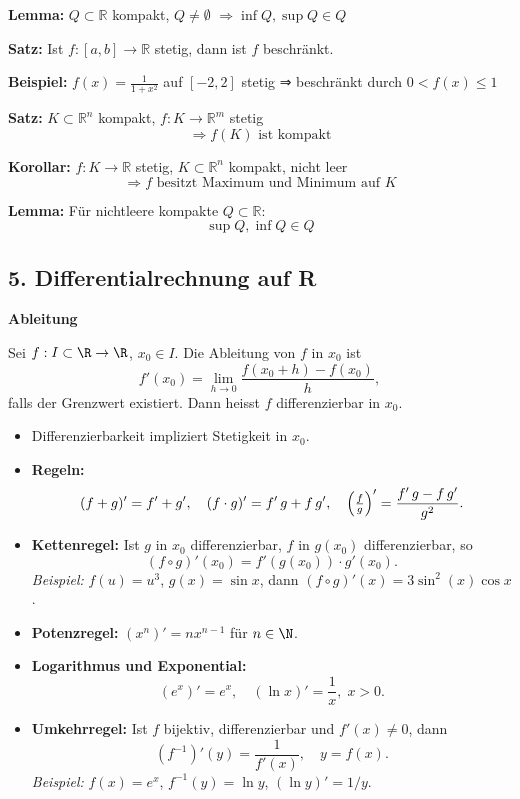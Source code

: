 \begin{itemize}
\textbf{Lemma:}  
\(Q \subset \mathbb{R}\) kompakt, \(Q \ne \emptyset\)  
\(\Rightarrow \inf Q, \sup Q \in Q\)

\textbf{Satz:}  
Ist \( f: [a,b] \to \mathbb{R} \) stetig, dann ist \( f \) beschränkt.

\textbf{Beispiel:}  
\( f(x) = \frac{1}{1 + x^2} \) auf \( [-2, 2] \) stetig ⇒ beschränkt durch \( 0 < f(x) \leq 1 \)

\textbf{Satz:}  
\( K \subset \mathbb{R}^n \) kompakt,\; \( f: K \to \mathbb{R}^m \) stetig  
\[
\Rightarrow f(K) \text{ ist kompakt}
\]


\textbf{Korollar:}  
\( f: K \to \mathbb{R} \) stetig, \( K \subset \mathbb{R}^n \) kompakt, nicht leer  
\[
\Rightarrow f \text{ besitzt Maximum und Minimum auf } K
\]


\textbf{Lemma:}  
Für nichtleere kompakte \( Q \subset \mathbb{R} \):  
\[
\sup Q, \inf Q \in Q
\]

\subsection{5. Differentialrechnung auf R}
\textbf{Ableitung}
\begin{definition}
  Sei $f:I\subset\R\to\R$, $x_0\in I$. Die Ableitung von $f$ in $x_0$ ist
  \[
    f'(x_0) = \lim_{h\to0} \frac{f(x_0 + h) - f(x_0)}{h},
  \]
  falls der Grenzwert existiert. Dann heisst $f$ differenzierbar in $x_0$.
\end{definition}
\begin{itemize}
  \item Differenzierbarkeit impliziert Stetigkeit in $x_0$.
  \item \textbf{Regeln:}
    \[
      (f+g)' = f' + g', \quad 
      (f\cdot g)' = f'\,g + f\,g', \quad
      \Bigl(\tfrac{f}{g}\Bigr)' = \frac{f'\,g - f\,g'}{g^2}.
    \]
  \item \textbf{Kettenregel:} Ist $g$ in $x_0$ differenzierbar, $f$ in $g(x_0)$ differenzierbar, so
    \[
      (f\circ g)'(x_0) = f'(g(x_0)) \cdot g'(x_0).
    \]
    \emph{Beispiel:} $f(u)=u^3$, $g(x)=\sin x$, dann $(f\circ g)'(x)=3\sin^2(x)\cos x$.
  \item \textbf{Potenzregel:} $(x^n)' = n x^{n-1}$ für $n\in\N$.
  \item \textbf{Logarithmus und Exponential:}  
    \[
      (e^x)' = e^x,\quad (\ln x)' = \frac{1}{x},\; x>0.
    \]
  \item \textbf{Umkehrregel:} Ist $f$ bijektiv, differenzierbar und $f'(x)\ne0$, dann
    \[
      (f^{-1})'(y) = \frac{1}{f'(x)},\quad y = f(x).
    \]
    \emph{Beispiel:} $f(x)=e^x$, $f^{-1}(y)=\ln y$, $(\ln y)' = 1/y$.
\end{itemize}


\end{itemize}
